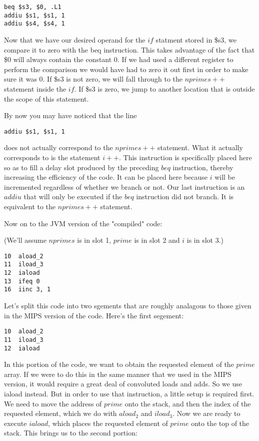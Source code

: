 \documentclass[11pt]{article}
\begin{document}
\begin{verbatim}
beq $s3, $0, .L1
addiu $s1, $s1, 1
addiu $s4, $s4, 1
\end{verbatim}

Now that we have our desired operand for the $if$ statment stored in \$s3, we compare it to zero with the beq instruction. This takes advantage of the fact that \$0 will always contain the constant 0. If we had used a different register to perform the comparison we would have had to zero it out first in order to make sure it was 0. If \$s3 is not zero, we will fall through to the $nprimes++$ statement inside the $if$. If \$s3 is zero, we jump to another location that is outside the scope of this statement. 

By now you may have noticed that the line

\begin{verbatim}
addiu $s1, $s1, 1
\end{verbatim}

does not actually correspond to the $nprimes++$ statement. What it actually corresponds to is the statement $i++$. This instruction is specifically placed here so as to fill a delay slot produced by the preceding $beq$ instruction, thereby increasing the efficiency of the code. It can be placed here because $i$ will be incremented regardless of whether we branch or not. Our last instruction is an $addiu$ that will only be executed if the $beq$ instruction did not branch. It is equivalent to the $nprimes++$ statement.


Now on to the JVM version of the "compiled" code:

(We'll assume $nprimes$ is in slot 1, $prime$ is in slot 2 and $i$ is in slot 3.)

\begin{verbatim}
10  aload_2
11  iload_3
12  iaload
13  ifeq 0
16  iinc 3, 1
\end{verbatim}

Let's split this code into two sgements that are roughly analagous to those given in the MIPS version of the code. Here's the first segement:

\begin{verbatim}
10  aload_2
11  iload_3
12  iaload
\end{verbatim}

In this portion of the code, we want to obtain the requested element of the $prime$ array. If we were to do this in the same manner that we used in the MIPS version, it would require a great deal of convoluted loads and adds. So we use iaload instead. But in order to use that instruction, a little setup is required first. We need to move the address of $prime$ onto the stack, and then the index of the requested element, which we do with $aload_2$ and $iload_3$. Now we are ready to execute $iaload$, which places the requested element of $prime$ onto the top of the stack. This brings us to the second portion:
\end{document}
